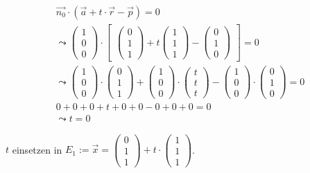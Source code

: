 \begin{gather}
\vec{n_0} \cdot (\vec{a}+t\cdot \vec{r}-\vec{p})=0\\
\leadsto 
\begin{pmatrix}
1\\0\\0
\end{pmatrix} \cdot 
\begin{bmatrix}
\begin{pmatrix}
0\\1\\1
\end{pmatrix}
+ t
\begin{pmatrix}
1\\1\\1
\end{pmatrix}
-
\begin{pmatrix}
0\\1\\0
\end{pmatrix}
\end{bmatrix} = 0\\
\leadsto
\begin{pmatrix}
1\\0\\0
\end{pmatrix}\cdot
\begin{pmatrix}
0\\1\\1
\end{pmatrix}
+
\begin{pmatrix}
1\\0\\0
\end{pmatrix}
\cdot
\begin{pmatrix}
t\\t\\t
\end{pmatrix}
-
\begin{pmatrix}
1\\0\\0
\end{pmatrix}
\cdot
\begin{pmatrix}
0\\1\\0
\end{pmatrix} =0\\
0+0+0+t+0+0-0+0+0=0\\
\leadsto t=0
\end{gather}

\ensuremath{t} einsetzen in \ensuremath{E_1:= \vec{x}=\begin{pmatrix}
		0\\1\\1
	\end{pmatrix} +t\cdot\begin{pmatrix}
		1\\1\\1
\end{pmatrix}}.\\

